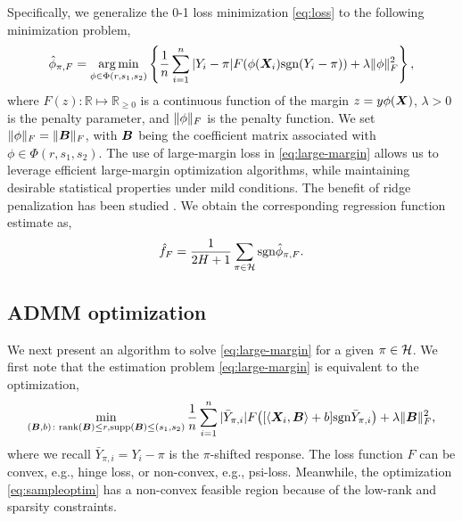 \documentclass[aos]{imsart}
\theoremstyle{definition}
\def\sign{\textup{sgn}}
\def\rank{\textup{rank}}
\begin{document}
Specifically, we generalize the 0-1 loss minimization \eqref{eq:loss} to the following minimization problem, 
\begin{align}\label{eq:large-margin}
\hat \phi_{\pi, F} = \argmin_{\phi \in\Phi(r,s_1,s_2)}\left\{ {1\over n}\sum_{i=1}^n |Y_i-\pi|F(\phi(\mX_i)\sign(Y_i-\pi))+ \lambda \FnormSize{}{\phi}^2\right\},
\end{align}
where $F(z)\colon \mathbb{R}\mapsto \mathbb{R}_{\geq 0}$ is a continuous function of the margin $z=y\phi(\bm X)$, $\lambda>0$ is the penalty parameter, and $\lVert\phi\rVert_F$ is the penalty function. We set $\lVert\phi\rVert_F=\lVert\bm B\rVert_F$, with $\bm B$ being the coefficient matrix associated with $\phi\in\Phi(r,s_1,s_2)$. The use of large-margin loss in \eqref{eq:large-margin} allows us to leverage efficient large-margin optimization algorithms, while maintaining desirable statistical properties under mild conditions. The benefit of ridge penalization has been studied \cite{shen2003psi}. We obtain the corresponding regression function estimate as, 
\begin{equation}\label{eq:stepfunction-large-margin}
\hat f_{F} = {1\over 2H+1}\sum_{\pi \in \tH} \sign \hat \phi_{\pi, F}.
\end{equation}



\subsection{ADMM optimization}

We next present an algorithm to solve \eqref{eq:large-margin} for a given $\pi\in\mathcal{H}$. We first note that the estimation problem \eqref{eq:large-margin} is equivalent to the optimization,
\begin{equation}\label{eq:sampleoptim}
\min_{\substack{(\mB,b)\colon  \rank(\mB)\leq r, \text{supp}(\mB)\leq (s_1,s_2)}}{1\over n}\sum_{i=1}^n|\bar Y_{\pi, i}| F\big( [\langle \mX_i,\mB \rangle+b] \sign \bar Y_{\pi, i}\big) + \lambda\FnormSize{}{\mB}^2,
\end{equation}
where we recall $\bar Y_{\pi, i}=Y_i-\pi$ is the $\pi$-shifted response. The loss function $F$ can be convex, e.g., hinge loss, or non-convex, e.g., psi-loss. Meanwhile, the optimization \eqref{eq:sampleoptim} has a non-convex feasible region because of the low-rank and sparsity constraints. 
\end{document}
